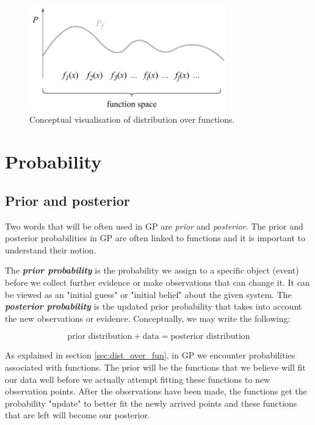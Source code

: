 \documentclass[10pt,twocolumn]{article}
\begin{document}
\begin{figure}[H]
\centering\includegraphics[width=8.5cm]{distribution-over-functions.pdf}
\caption{Conceptual visualisation of distribution over functions.}
\label{fig:distr_over_fun}
\end{figure}

\section{Probability}

\subsection{Prior and posterior}

Two words that will be often used in GP are \textit{prior} and \textit{posterior}. The prior and posterior probabilities in GP are often linked to functions and it is important to understand their notion.

The \textbf{\textit{prior probability}} is the probability we assign to a specific object (event) before we collect further evidence or make observations that can change it. It can be viewed as an "initial guess" or "initial belief" about the given system. The \textbf{\textit{posterior probability}} is the updated prior probability that takes into account the new observations or evidence. Conceptually, we may write the following:

\begin{equation}
\text{prior distribution} + \text{data} = \text{posterior distribution}
\end{equation}

As explained in section \ref{sec:dist_over_fun}, in GP we encounter probabilities associated with functions. The prior will be the functions that we believe will fit our data well before we actually attempt fitting these functions to new observation points. After the observations have been made, the functions get the probability "update" to better fit the newly arrived points and these functions that are left will become our posterior.
\end{document}
